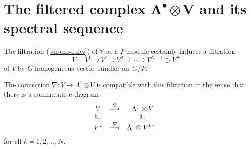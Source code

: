 \section[The filtered complex $\Lambda^\bullet\otimes V$ and its spectral sequence]{The f\/iltered complex $\boldsymbol{\Lambda^\bullet\otimes V}$ and its spectral sequence}

The f\/iltration (\ref{submodules}) of ${\mathbb{V}}$ as a $P$-module certainly
induces a f\/iltration
\[
V=V^0\supseteq V^1\supseteq V^2\supseteq\cdots\supseteq V^{N-1}\supset V^N
\]
of $V$ by $G$-homogeneous vector bundles on~$G/P$.
\begin{theorem}\label{compatible} The connection
$\nabla:V\to\Lambda^1\otimes V$ is compatible with this filtration in the
sense that there is a commutative diagram
\[\begin{array}{ccc}V&\stackrel{\nabla}{\longrightarrow}&\Lambda^1\otimes V\\
\rule[.7pt]{.4pt}{6pt}\hspace*{.7pt}\cup
&&\rule[.7pt]{.4pt}{6pt}\hspace*{.7pt}\cup\\
V^k&\stackrel{\nabla}{\longrightarrow}&\Lambda^1\otimes V^{k-1}
\end{array}\]
for all $k=1,2,\ldots,N$.
\end{theorem}
